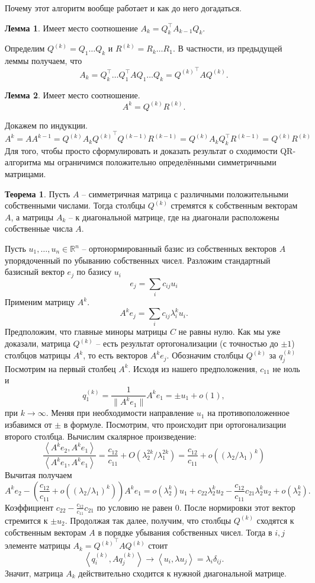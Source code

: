 \documentclass[12pt,a4paper,oneside]{book}
\theoremstyle{definition}
\newtheorem{thm}{\color{red!40!black}Теорема}
\newtheorem{lem}{\color{green!50!black}Лемма}
\newcommand{\R}{\mathbb R}
\def\lan{\left\langle }
\def\ran{\right\rangle}
\def\thrm{\begin{thm}}
\def\ethrm{\end{thm}}
\def\lm{\begin{lem}}
\def\elm{\end{lem}}
\begin{document}
Почему этот алгоритм вообще работает и как до него догадаться.

\lm Имеет место соотношение $A_k=Q_k^\top A_{k-1} Q_k$.
\elm

Определим $Q^{(k)}=Q_1\dots Q_k$ и $R^{(k)}= R_k \dots R_1$. В частности, из предыдущей леммы получаем, что $$A_k=Q_k^\top \dots Q_1^\top A Q_1 \dots Q_k= {Q^{(k)}}^\top A Q^{(k)}.$$

\lm  Имеет место соотношение. 
$$A^k=Q^{(k)}R^{(k)}.$$
\elm
\proof Докажем по индукции. 
$$A^k=A A^{k-1}= Q^{(k)}A_k{Q^{(k)}}^\top Q^{(k-1)}R^{(k-1)} = Q^{(k)}A_k Q_k^\top R^{(k-1)}=Q^{(k)} R^{(k)}$$
\endproof
Для того, чтобы просто сформулировать и доказать результат о сходимости QR-алгоритма мы ограничимся положительно определёнными симметричными матрицами.

\thrm Пусть $A$ -- симметричная матрица с различными положительными собственными числами. Тогда столбцы $Q^{(k)}$ стремятся к собственным векторам $A$, а матрицы $A_k$ -- к диагональной матрице, где на диагонали расположены собственные числа $A$.
\ethrm
\proof  Пусть $u_1,\dots,u_n \in \R^n$ -- ортонормированный базис из собственных векторов $A$ упорядоченный по убыванию собственных чисел.
Разложим стандартный базисный вектор $e_j$ по базису $u_i$
$$e_j = \sum_i c_{ij} u_i $$
Применим матрицу $A^k$. 
$$A^k e_j = \sum_i c_{ij} \lambda_i^k u_i.$$
Предположим, что главные миноры матрицы $C$ не равны нулю.
Как мы уже доказали, матрица $Q^{(k)}$ -- есть результат ортогонализации (с точностью до $\pm 1$) столбцов матрицы $A^k$, то есть векторов $A^k e_j$. Обозначим столбцы $Q^{(k)}$ за $q^{(k)}_j$ Посмотрим на первый столбец $A^k$. Исходя из нашего предположения, $c_{11}$ не ноль и
$$q^{(k)}_1=\frac1{\|A^ke_1\|} A^k e_1 = \pm u_1 + o(1),$$
при $k\to \infty$. Меняя при необходимости направление $u_1$ на противоположенное избавимся от $\pm$ в формуле. Посмотрим, что происходит при ортогонализации второго столбца. Вычислим скалярное произведение:
$$\frac{\lan A^k e_2, A^k e_1 \ran}{\lan A^k e_1, A^k e_1 \ran} = \frac{c_{12}}{c_{11}}+ O\left( \lambda_2^{2k}/\lambda_1^{2k}\right)
=\frac{c_{12}}{c_{11}}+ o \left(\left(\lambda_2/\lambda_1 \right)^k\right)  $$
Вычитая получаем
$$ A^k e_2 - \left(\frac{c_{12}}{c_{11}}+ o \left(\left(\lambda_2/\lambda_1\right)^k\right)\right) A^k e_1= o(\lambda_2^k)u_1+ c_{22}\lambda_2^ku_2 - \frac{c_{12}}{c_{11}}c_{21}\lambda_2^k u_2 +o(\lambda_2^k).$$
Коэффициент $c_{22}-\frac{c_{12}}{c_{11}}c_{21}$ по условию не равен $0$. После нормировки этот вектор стремится к $\pm u_2$. Продолжая так далее, получим, что столбцы $Q^{(k)}$ сходятся к собственным векторам $A$ в порядке убывания собственных чисел. Тогда в $i,j$ элементе матрицы $A_k={Q^{(k)}}^\top A Q^{(k)}$  стоит
$$\lan q^{(k)}_i, Aq^{(k)}_j\ran \to \lan u_i, \lambda u_j \ran = \lambda_i \delta_{ij}.$$
Значит, матрица $A_k$ действительно сходится к нужной диагональной матрице.
\endproof
\end{document}
